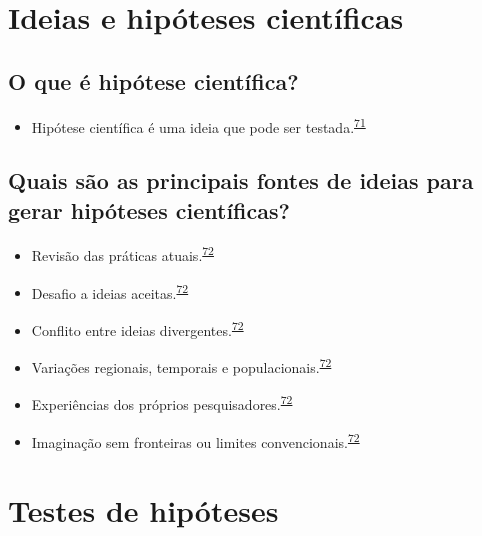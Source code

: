 \documentclass[
]{book}
\providecommand{\tightlist}{%
  \setlength{\itemsep}{0pt}\setlength{\parskip}{0pt}}
\begin{document}
\hypertarget{ideias-hipoteses}{%
\section{Ideias e hipóteses científicas}\label{ideias-hipoteses}}

\hypertarget{o-que-uxe9-hipuxf3tese-cientuxedfica}{%
\subsection{O que é hipótese científica?}\label{o-que-uxe9-hipuxf3tese-cientuxedfica}}

\begin{itemize}
\tightlist
\item
  Hipótese científica é uma ideia que pode ser testada.\textsuperscript{\protect\hyperlink{ref-Curran-Everett2009}{71}}
\end{itemize}

\hypertarget{quais-suxe3o-as-principais-fontes-de-ideias-para-gerar-hipuxf3teses-cientuxedficas}{%
\subsection{Quais são as principais fontes de ideias para gerar hipóteses científicas?}\label{quais-suxe3o-as-principais-fontes-de-ideias-para-gerar-hipuxf3teses-cientuxedficas}}

\begin{itemize}
\item
  Revisão das práticas atuais.\textsuperscript{\protect\hyperlink{ref-Vandenbroucke2018}{72}}
\item
  Desafio a ideias aceitas.\textsuperscript{\protect\hyperlink{ref-Vandenbroucke2018}{72}}
\item
  Conflito entre ideias divergentes.\textsuperscript{\protect\hyperlink{ref-Vandenbroucke2018}{72}}
\item
  Variações regionais, temporais e populacionais.\textsuperscript{\protect\hyperlink{ref-Vandenbroucke2018}{72}}
\item
  Experiências dos próprios pesquisadores.\textsuperscript{\protect\hyperlink{ref-Vandenbroucke2018}{72}}
\item
  Imaginação sem fronteiras ou limites convencionais.\textsuperscript{\protect\hyperlink{ref-Vandenbroucke2018}{72}}
\end{itemize}

\hypertarget{erros-inferencia}{%
\section{Testes de hipóteses}\label{erros-inferencia}}
\end{document}
